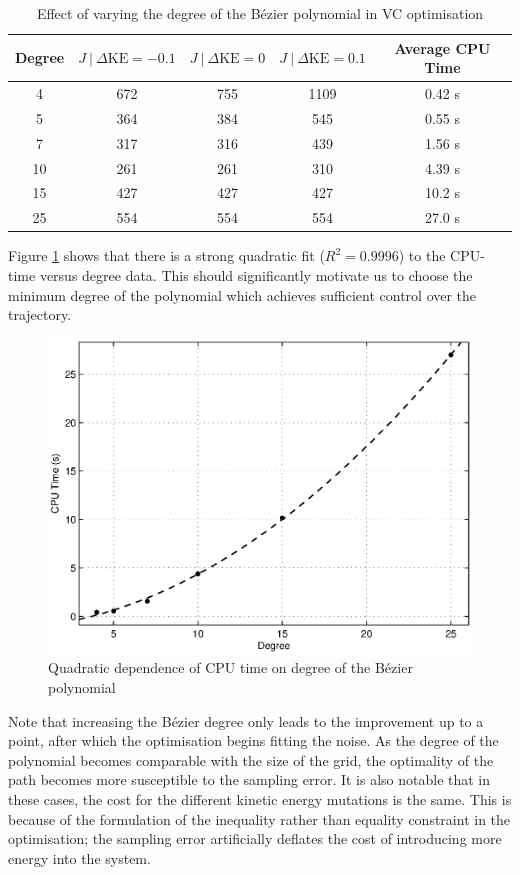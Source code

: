 \begin{table}
	\centering
	\begin{tabular}{c || c | c |c || c}
		Degree & $J~|~{\Delta\mathrm{KE}=-0.1}$ & $J~|~{\Delta\mathrm{KE}=0}$ & $J~|~{\Delta\mathrm{KE}=0.1}$ & Average CPU Time \\ \hline
		4  & 672 & 755 & 1109 & 0.42 s \\
		5  & 364 & 384 & 545  & 0.55 s \\
		7  & 317 & 316 & 439  & 1.56 s \\
		10 & 261 & 261 & 310  & 4.39 s \\
		15 & 427 & 427 & 427  & 10.2 s \\
		25 & 554 & 554 & 554  & 27.0 s
	\end{tabular}
	\caption{Effect of varying the degree of the Bézier polynomial in VC optimisation}
	\label{tab:degpol}
\end{table}

Figure \ref{fig:timevsdeg} shows that there is a strong quadratic fit ($R^2=0.9996$) to the CPU-time versus degree data. This should significantly motivate us to choose the minimum degree of the polynomial which achieves sufficient control over the trajectory.

\begin{figure}
\centering
\includegraphics[width=0.6\linewidth]{7Results/timevsdeg}
\caption{Quadratic dependence of CPU time on degree of the Bézier polynomial}
\label{fig:timevsdeg}
\end{figure}

Note that increasing the Bézier degree only leads to the improvement up to a point, after which the optimisation begins fitting the noise. As the degree of the polynomial becomes comparable with the size of the grid, the optimality of the path becomes more susceptible to the sampling error. It is also notable that in these cases, the cost for the different kinetic energy mutations is the same. This is because of the formulation of the inequality rather than equality constraint in the optimisation; the sampling error artificially deflates the cost of introducing more energy into the system.

